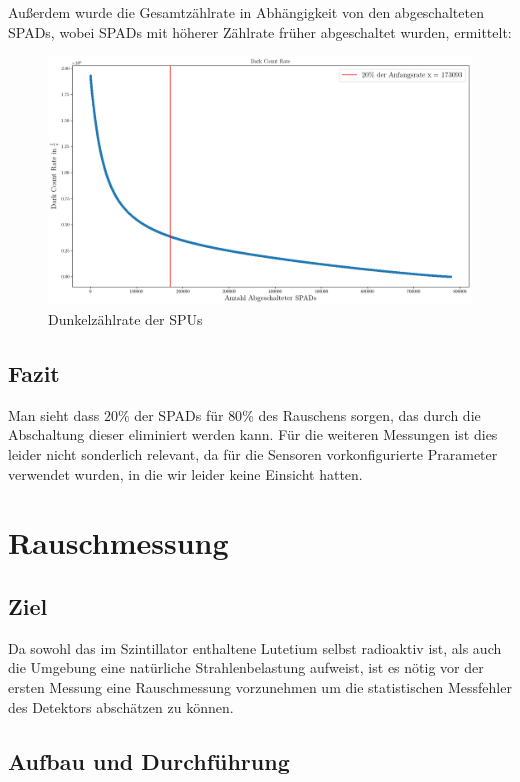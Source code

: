 \documentclass[12pt,twoside,a4paper]{scrartcl}
\begin{document}
			Außerdem wurde die Gesamtzählrate in Abhängigkeit von den abgeschalteten SPADs, wobei SPADs mit höherer Zählrate früher abgeschaltet wurden, ermittelt:

			\begin{figure}[H]
				\centering
				\includegraphics[width = 0.9 \textwidth]{Plots/DCM/DCR_vs_N.png}
				\caption{Dunkelzählrate der SPUs}
			\end{figure}

		\subsection{Fazit}

		Man sieht dass $20 \%$ der SPADs für $80 \%$ des Rauschens sorgen, das durch die Abschaltung dieser eliminiert werden kann. Für die weiteren Messungen ist dies leider nicht sonderlich relevant, da für die Sensoren vorkonfigurierte Prarameter verwendet wurden, in die wir leider keine Einsicht hatten.

	\section{Rauschmessung}

	\subsection{Ziel}

		Da sowohl das im Szintillator enthaltene Lutetium selbst radioaktiv ist, als auch die Umgebung eine natürliche Strahlenbelastung aufweist, ist es nötig vor der ersten Messung eine Rauschmessung vorzunehmen um die statistischen Messfehler des Detektors abschätzen zu können.

	\subsection{Aufbau und Durchführung}
\end{document}
